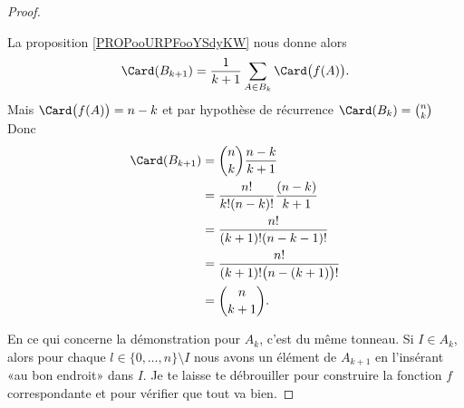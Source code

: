 \begin{proof}
\begin{subproof}
		La proposition \ref{PROPooURPFooYSdyKW} nous donne alors
		\begin{equation}
			\Card(B_{k+1})=\frac{1}{ k+1}\sum_{A\in B_k}\Card\big( f(A) \big).
		\end{equation}
		Mais \( \Card\big( f(A) \big)=n-k\) et par hypothèse de récurrence \( \Card(B_k)={n\choose k}\) Donc
		\begin{subequations}
			\begin{align}
				\Card(B_{k+1}) & =\binom{ n }{ k }\frac{ n-k }{ k+1 }           \\
				               & = \frac{ n! }{ k!(n-k)! }\frac{ (n-k) }{ k+1 } \\
				               & =\frac{ n! }{ (k+1)!(n-k-1)! }                 \\
				               & =\frac{ n! }{ (k+1)!\big( n-(k+1) \big)! }     \\
				               & =\binom{ n }{ k+1 }.
			\end{align}
		\end{subequations}
	\end{subproof}

	En ce qui concerne la démonstration pour \( A_k\), c'est du même tonneau. Si \( I\in A_k\), alors pour chaque \( l\in \{ 0,\ldots,n \}\setminus I\) nous avons un élément de \( A_{k+1}\) en l'insérant «au bon endroit» dans \( I\). Je te laisse te débrouiller pour construire la fonction \( f\) correspondante et pour vérifier que tout va bien.


\end{proof}
